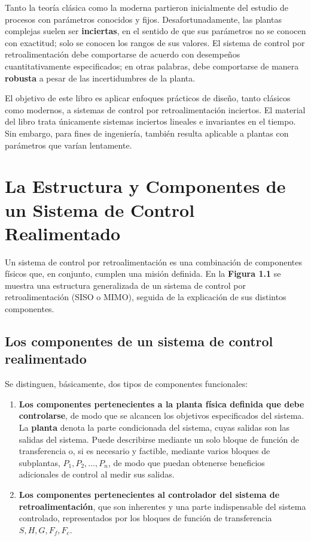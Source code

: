 Tanto la teoría clásica como la moderna partieron inicialmente del estudio de procesos con parámetros conocidos y fijos. Desafortunadamente, las plantas complejas suelen ser \textbf{inciertas}, en el sentido de que sus parámetros no se conocen con exactitud; solo se conocen los rangos de sus valores. El sistema de control por retroalimentación debe comportarse de acuerdo con desempeños cuantitativamente especificados; en otras palabras, debe comportarse de manera \textbf{robusta} a pesar de las incertidumbres de la planta.

El objetivo de este libro es aplicar enfoques prácticos de diseño, tanto clásicos como modernos, a sistemas de control por retroalimentación inciertos. El material del libro trata únicamente sistemas inciertos lineales e invariantes en el tiempo. Sin embargo, para fines de ingeniería, también resulta aplicable a plantas con parámetros que varían lentamente.


\section{La Estructura y Componentes de un Sistema de Control Realimentado}
Un sistema de control por retroalimentación es una combinación de componentes físicos que, en conjunto, cumplen una misión definida. En la \textbf{Figura 1.1} se muestra una estructura generalizada de un sistema de control por retroalimentación (SISO o MIMO), seguida de la explicación de sus distintos componentes.


\subsection{Los componentes de un sistema de control realimentado}
Se distinguen, básicamente, dos tipos de componentes funcionales:

\begin{enumerate}
  \item \textbf{Los componentes pertenecientes a la planta física definida que debe controlarse}, de modo que se alcancen los objetivos especificados del sistema. La \textbf{planta} denota la parte condicionada del sistema, cuyas salidas son las salidas del sistema. Puede describirse mediante un solo bloque de función de transferencia o, si es necesario y factible, mediante varios bloques de subplantas, \(P_1, P_2, \ldots, P_n\), de modo que puedan obtenerse beneficios adicionales de control al medir sus salidas.

  \item \textbf{Los componentes pertenecientes al controlador del sistema de retroalimentación}, que son inherentes y una parte indispensable del sistema controlado, representados por los bloques de función de transferencia \(S, H, G, F_f, F_c\).

\end{enumerate}


